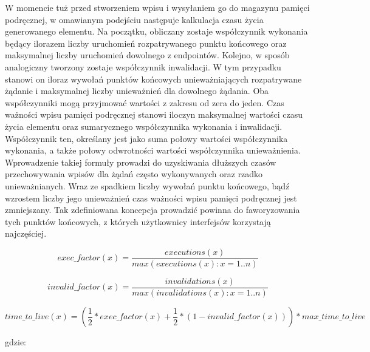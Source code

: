 W momencie tuż przed stworzeniem wpisu i wysyłaniem go do magazynu pamięci podręcznej, w omawianym podejściu następuje kalkulacja czasu życia generowanego elementu. Na początku, obliczany zostaje współczynnik wykonania będący ilorazem liczby uruchomień rozpatrywanego punktu końcowego oraz maksymalnej liczby uruchomień dowolnego z endpointów. Kolejno, w sposób analogiczny tworzony zostaje współczynnik inwalidacji. W tym przypadku stanowi on iloraz wywołań punktów końcowych unieważniających rozpatrywane żądanie i maksymalnej liczby unieważnień dla dowolnego żądania. Oba współczynniki mogą przyjmować wartości z zakresu od zera do jeden. Czas ważności wpisu pamięci podręcznej stanowi iloczyn maksymalnej wartości czasu życia elementu oraz sumarycznego współczynnika wykonania i inwalidacji. Współczynnik ten, określany jest jako suma połowy wartości współczynnika wykonania, a także połowy odwrotności wartości współczynnika unieważnienia. Wprowadzenie takiej formuły prowadzi do uzyskiwania dłuższych czasów przechowywania wpisów dla żądań często wykonywanych oraz rzadko unieważnianych. Wraz ze spadkiem liczby wywołań punktu końcowego, bądź wzrostem liczby jego unieważnień czas ważności wpisu pamięci podręcznej jest zmniejszany. Tak zdefiniowana koncepcja prowadzić powinna do faworyzowania tych punktów końcowych, z których użytkownicy interfejsów korzystają najczęściej.

\begin{equation}
    exec\_factor(x) =  \frac{executions(x)}{max(executions(x):x=1..n)}
    \label{eq:execution-factor}
\end{equation}

\begin{equation}
    invalid\_factor(x) =  \frac{invalidations(x)}{max(invalidations(x):x=1..n)}
    \label{eq:invalidation-factor}
\end{equation}

\begin{equation}
    time\_to\_live(x) = (\frac{1}{2} * exec\_factor(x) + \frac{1}{2} * (1 - invalid\_factor(x))) * max\_time\_to\_live
    \label{eq:time-to-live}
\end{equation}



gdzie:\newline\newline




